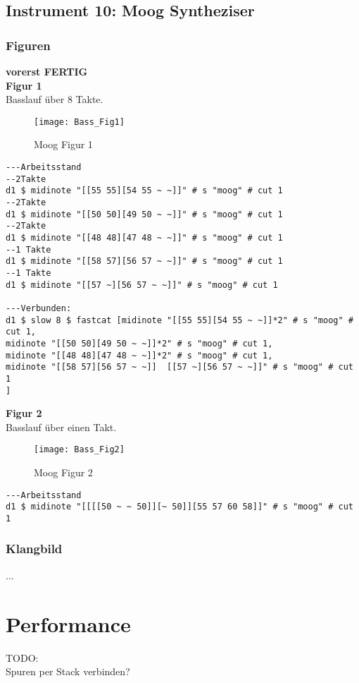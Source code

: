 \documentclass[
10pt, %
a4paper, %
oneside, %
headinclude,footinclude, %
BCOR5mm, %
]{scrartcl}
\begin{document}
\subsection{Instrument 10: Moog Syntheziser}
\subsubsection{Figuren}
{\color{green}\textbf{vorerst FERTIG}} \\

\noindent\textbf{Figur 1}\\
Basslauf über 8 Takte.\\
\begin{figure}[h]
	\centering 
	\texttt{[image: Bass\_Fig1]} 
	\caption{Moog Figur 1}
\end{figure}

\begin{lstlisting}
---Arbeitsstand
--2Takte
d1 $ midinote "[[55 55][54 55 ~ ~]]" # s "moog" # cut 1
--2Takte
d1 $ midinote "[[50 50][49 50 ~ ~]]" # s "moog" # cut 1
--2Takte
d1 $ midinote "[[48 48][47 48 ~ ~]]" # s "moog" # cut 1
--1 Takte
d1 $ midinote "[[58 57][56 57 ~ ~]]" # s "moog" # cut 1
--1 Takte
d1 $ midinote "[[57 ~][56 57 ~ ~]]" # s "moog" # cut 1

---Verbunden:
d1 $ slow 8 $ fastcat [midinote "[[55 55][54 55 ~ ~]]*2" # s "moog" # cut 1,
midinote "[[50 50][49 50 ~ ~]]*2" # s "moog" # cut 1,
midinote "[[48 48][47 48 ~ ~]]*2" # s "moog" # cut 1,
midinote "[[58 57][56 57 ~ ~]]  [[57 ~][56 57 ~ ~]]" # s "moog" # cut 1
]
\end{lstlisting}

\noindent\textbf{Figur 2}\\
Basslauf über einen Takt.
\begin{figure}[h]
	\centering 
	\texttt{[image: Bass\_Fig2]} 
	\caption{Moog Figur 2}
\end{figure}

\begin{lstlisting}
---Arbeitsstand
d1 $ midinote "[[[[50 ~ ~ 50]][~ 50]][55 57 60 58]]" # s "moog" # cut 1
\end{lstlisting}



\subsubsection{Klangbild}
...

\section{Performance}
TODO:\\
Spuren per Stack verbinden?\\
\end{document}
